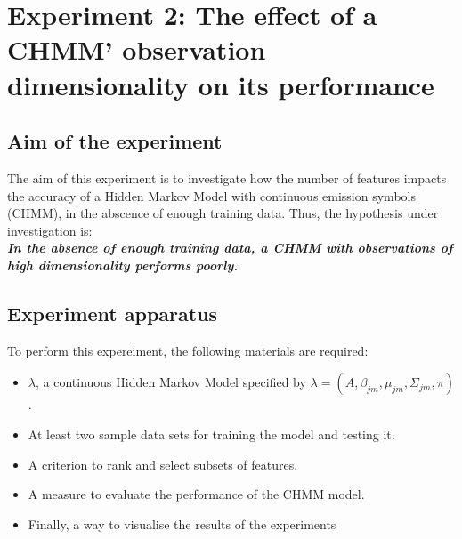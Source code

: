 \newpage
\section{Experiment 2: The effect of a CHMM' observation dimensionality on its performance} \label{exp:feat-size}

\subsection{Aim of the experiment}
The aim of this experiment is to investigate how the number of features impacts the accuracy of a Hidden Markov Model with continuous emission symbols (CHMM), in the abscence of enough training data. Thus, the hypothesis under investigation is:\\
\textbf{\textit{In the absence of enough training data, a CHMM with observations of high dimensionality performs poorly.}}

\subsection{Experiment apparatus}
To perform this expereiment, the following materials are required:
\begin{itemize}
	\item \(\lambda\), a continuous Hidden Markov Model specified by \(\lambda = (A, \beta_{jm}, \mu_{jm}, \Sigma_{jm}, \pi)\).
	\item At least two sample data sets for training the model and testing it.
	\item A criterion to rank and select subsets of features.
	\item A measure to evaluate the performance of the CHMM model.
	\item Finally, a way to visualise the results of the experiments
\end{itemize}

